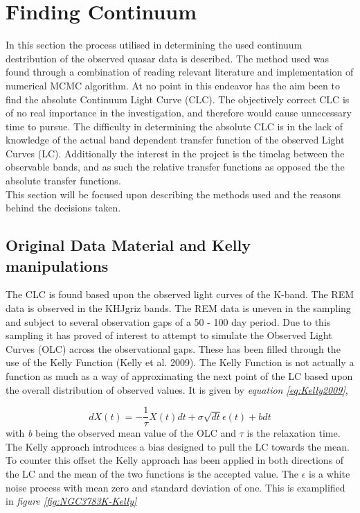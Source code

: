 \documentclass[twocolumn]{article}
\begin{document}
\section{Finding Continuum}
In this section the process utilised in determining the used continuum destribution of the observed quasar data is described. The method used was found through a combination of reading relevant literature and implementation of numerical MCMC algorithm. At no point in this endeavor has the aim been to find the absolute Continuum Light Curve (CLC). The objectively correct CLC is of no real importance in the investigation, and therefore would cause unnecessary time to pursue. The difficulty in determining the absolute CLC is in the lack of knowledge of the actual band dependent transfer function of the observed Light Curves (LC). Additionally the interest in the project is the timelag between the observable bands, and as such the relative transfer functions as opposed the the absolute transfer functions. \\
This section will be focused upon describing the methods used and the reasons behind the decisions taken.\\

\subsection{Original Data Material and Kelly manipulations}
The CLC is found based upon the observed light curves of the K-band. The REM data is observed in the KHJgriz bands. The REM data is uneven in the sampling and subject to several observation gaps of a 50 - 100 day period. Due to this sampling it has proved of interest to attempt to simulate the Observed Light Curves (OLC) across the observational gaps. These has been filled through the use of the Kelly Function (Kelly et al. 2009). The Kelly Function is not actually a function as much as a way of approximating the next point of the LC based upon the overall distribution of observed values. It is given by \emph{equation \ref{eq:Kelly2009}},

\begin{equation}
dX(t) = -\frac{1}{\tau}X(t)dt + \sigma\sqrt{dt}\epsilon(t) + bdt
\label{eq:Kelly2009}
\end{equation}
with \emph{b} being the observed mean value of the OLC and $\tau$ is the relaxation time. The Kelly approach introduces a bias designed to pull the LC towards the mean. To counter this offset the Kelly approach has been applied in both directions of the LC and the mean of the two functions is the accepted value. The $\epsilon$ is a white noise process with mean zero and standard deviation of one. This is examplified in \emph{figure \ref{fig:NGC3783K-Kelly}}
\end{document}
